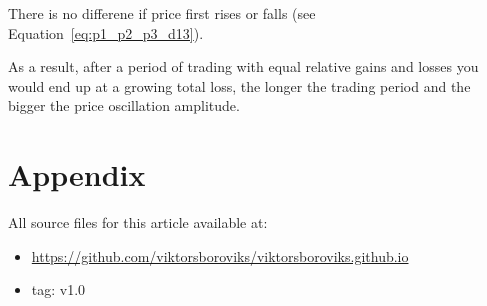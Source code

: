 \documentclass[a4paper]{article}
\begin{document}
There is no differene if price first rises or falls (see Equation~\ref{eq:p1_p2_p3_d13}).

As a result, after a period of trading with equal relative gains and losses
you would end up at a growing total loss, the longer the trading period and
the bigger the price oscillation amplitude.

\clearpage
\section*{Appendix}

All source files for this article available at:

\begin{itemize}
\item \url{https://github.com/viktorsboroviks/viktorsboroviks.github.io}
\item tag: v1.0
\end{itemize}


\begin{onecolumn}

\begin{versionhistory}
\end{versionhistory}

\end{onecolumn}
\end{document}
